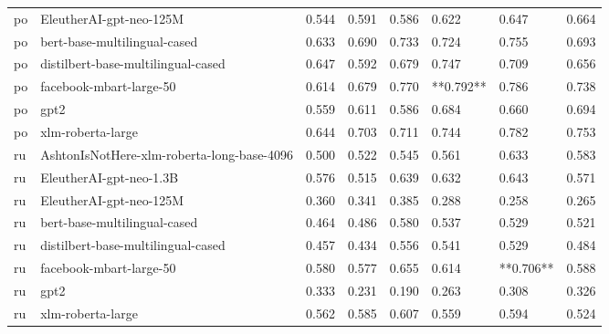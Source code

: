 \begin{tabular}{llllllll}
      po &                    EleutherAI-gpt-neo-125M & 0.544 &                     0.591 &                 0.586 &                  0.622 &                                   0.647 &    0.664 \\
      po &               bert-base-multilingual-cased & 0.633 &                     0.690 &                 0.733 &                  0.724 &                                   0.755 &    0.693 \\
      po &         distilbert-base-multilingual-cased & 0.647 &                     0.592 &                 0.679 &                  0.747 &                                   0.709 &    0.656 \\
      po &                    facebook-mbart-large-50 & 0.614 &                     0.679 &                 0.770 &              **0.792** &                                   0.786 &    0.738 \\
      po &                                       gpt2 & 0.559 &                     0.611 &                 0.586 &                  0.684 &                                   0.660 &    0.694 \\
      po &                          xlm-roberta-large & 0.644 &                     0.703 &                 0.711 &                  0.744 &                                   0.782 &    0.753 \\
      ru & AshtonIsNotHere-xlm-roberta-long-base-4096 & 0.500 &                     0.522 &                 0.545 &                  0.561 &                                   0.633 &    0.583 \\
      ru &                    EleutherAI-gpt-neo-1.3B & 0.576 &                     0.515 &                 0.639 &                  0.632 &                                   0.643 &    0.571 \\
      ru &                    EleutherAI-gpt-neo-125M & 0.360 &                     0.341 &                 0.385 &                  0.288 &                                   0.258 &    0.265 \\
      ru &               bert-base-multilingual-cased & 0.464 &                     0.486 &                 0.580 &                  0.537 &                                   0.529 &    0.521 \\
      ru &         distilbert-base-multilingual-cased & 0.457 &                     0.434 &                 0.556 &                  0.541 &                                   0.529 &    0.484 \\
      ru &                    facebook-mbart-large-50 & 0.580 &                     0.577 &                 0.655 &                  0.614 &                               **0.706** &    0.588 \\
      ru &                                       gpt2 & 0.333 &                     0.231 &                 0.190 &                  0.263 &                                   0.308 &    0.326 \\
      ru &                          xlm-roberta-large & 0.562 &                     0.585 &                 0.607 &                  0.559 &                                   0.594 &    0.524 \\
\bottomrule
\end{tabular}
